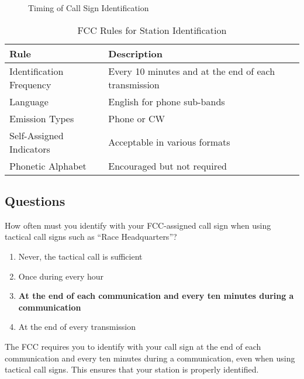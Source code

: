 \begin{figure}[h]
    \centering
    \caption{Timing of Call Sign Identification}
    \label{fig:call-sign-timing}
\end{figure}

\begin{table}[h]
    \centering
    \begin{tabular}{|l|l|}
        \hline
        \textbf{Rule} & \textbf{Description} \\
        \hline
        Identification Frequency & Every 10 minutes and at the end of each transmission \\
        Language & English for phone sub-bands \\
        Emission Types & Phone or CW \\
        Self-Assigned Indicators & Acceptable in various formats \\
        Phonetic Alphabet & Encouraged but not required \\
        \hline
    \end{tabular}
    \caption{FCC Rules for Station Identification}
    \label{tab:station-id-rules}
\end{table}

\subsection*{Questions}
\begin{tcolorbox}[colback=gray!10!white,colframe=black!75!black,title={T1F02}]
    How often must you identify with your FCC-assigned call sign when using tactical call signs such as “Race Headquarters”?
    \begin{enumerate}[label=\Alph*),noitemsep]
        \item Never, the tactical call is sufficient
        \item Once during every hour
        \item \textbf{At the end of each communication and every ten minutes during a communication}
        \item At the end of every transmission
    \end{enumerate}
\end{tcolorbox}
The FCC requires you to identify with your call sign at the end of each communication and every ten minutes during a communication, even when using tactical call signs. This ensures that your station is properly identified.

